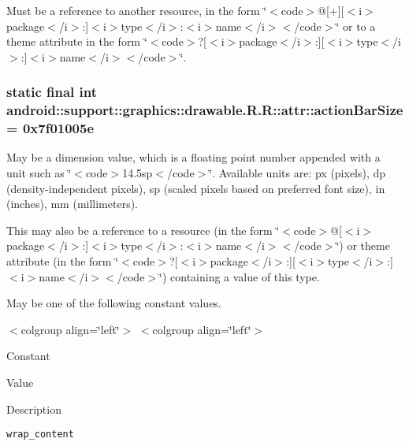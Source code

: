 Must be a reference to another resource, in the form \char`\"{}$<$code$>$@\mbox{[}+\mbox{]}\mbox{[}$<$i$>$package$<$/i$>$:\mbox{]}$<$i$>$type$<$/i$>$:$<$i$>$name$<$/i$>$$<$/code$>$\char`\"{} or to a theme attribute in the form \char`\"{}$<$code$>$?\mbox{[}$<$i$>$package$<$/i$>$:\mbox{]}\mbox{[}$<$i$>$type$<$/i$>$:\mbox{]}$<$i$>$name$<$/i$>$$<$/code$>$\char`\"{}. \hypertarget{classandroid_1_1support_1_1graphics_1_1drawable_1_1_r_1_1attr_0b7bad1a9da4d07dcba72d6820f113c0}{
\subsubsection[{actionBarSize}]{\setlength{\rightskip}{0pt plus 5cm}static final int android::support::graphics::drawable.R.R::attr::actionBarSize = 0x7f01005e}}
\label{classandroid_1_1support_1_1graphics_1_1drawable_1_1_r_1_1attr_0b7bad1a9da4d07dcba72d6820f113c0}


May be a dimension value, which is a floating point number appended with a unit such as \char`\"{}$<$code$>$14.5sp$<$/code$>$\char`\"{}. Available units are: px (pixels), dp (density-independent pixels), sp (scaled pixels based on preferred font size), in (inches), mm (millimeters). 

This may also be a reference to a resource (in the form \char`\"{}$<$code$>$@\mbox{[}$<$i$>$package$<$/i$>$:\mbox{]}$<$i$>$type$<$/i$>$:$<$i$>$name$<$/i$>$$<$/code$>$\char`\"{}) or theme attribute (in the form \char`\"{}$<$code$>$?\mbox{[}$<$i$>$package$<$/i$>$:\mbox{]}\mbox{[}$<$i$>$type$<$/i$>$:\mbox{]}$<$i$>$name$<$/i$>$$<$/code$>$\char`\"{}) containing a value of this type. 

May be one of the following constant values. \begin{TabularC}{0}
\hline
\end{TabularC}
$<$colgroup align=\char`\"{}left\char`\"{}$>$ $<$colgroup align=\char`\"{}left\char`\"{}$>$ 

Constant

Value

Description 

{\tt wrap\_\-content}

